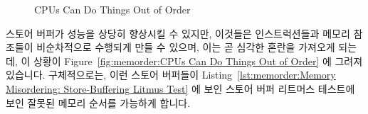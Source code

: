 \begin{figure}[tb]
\centering
{}
\caption{CPUs Can Do Things Out of Order}
\end{figure}

스토어 버퍼가 성능을 상당히 향상시킬 수 있지만, 이것들은 인스트럭션들과
메모리 참조들이 비순차적으로 수행되게 만들 수 있으며, 이는 곧 심각한 혼란을
가져오게 되는데, 이 상황이
Figure~\ref{fig:memorder:CPUs Can Do Things Out of Order} 에 그려져 있습니다.
구체적으로는, 이런 스토어 버퍼들이
Listing~\ref{lst:memorder:Memory Misordering: Store-Buffering Litmus Test} 에
보인 스토어 버퍼 리트머스 테스트에 보인 잘못된 메모리 순서를 가능하게 합니다.

